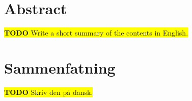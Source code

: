 \begingroup
\let\clearpage\relax
\let\cleardoublepage\relax
\let\cleardoublepage\relax

\chapter*{Abstract}
\colorbox{yellow}{\textbf{TODO} Write a short summary of the contents in English.}

\vfill

\chapter*{Sammenfatning}
\colorbox{yellow}{\textbf{TODO} Skriv den på dansk.}


\endgroup			

\vfill